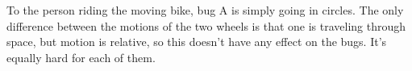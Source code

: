 To the person riding the moving bike, bug A is simply
going in circles. The only difference between the motions of
the two wheels is that one is traveling through space, but
motion is relative, so this doesn't have any effect on the
bugs. It's equally hard for each of them.



